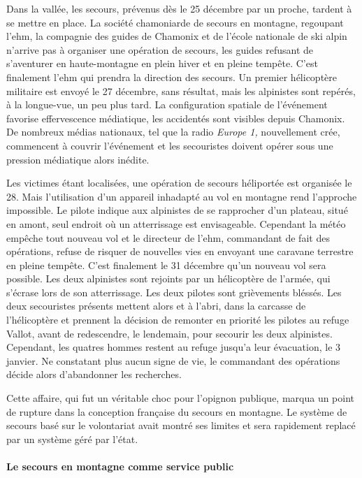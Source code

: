 Dans la vallée, les secours, prévenus dès le 25 décembre par un
proche, tardent à se mettre en place. La société chamoniarde de
secours en montagne, regoupant l'\ac{ehm}, la compagnie des guides de
Chamonix et de l'école nationale de ski alpin n'arrive pas à organiser
une opération de secours, les guides refusant de s'aventurer en
haute-montagne en plein hiver et en pleine tempête. C'est finalement
l'\ac{ehm} qui prendra la direction des secours. Un premier
hélicoptère militaire est envoyé le 27 décembre, sans résultat, mais
les alpinistes sont repérés, à la longue-vue, un peu plus tard. La
configuration spatiale de l'événement favorise effervescence
médiatique, les accidentés sont visibles depuis Chamonix. De nombreux
médias nationaux, tel que la radio \emph{Europe 1,} nouvellement crée,
commencent à couvrir l'événement et les secouristes doivent opérer
sous une pression médiatique alors inédite.

Les victimes étant localisées, une opération de secours héliportée est
organisée le 28. Mais l'utilisation d'un appareil inhadapté au vol en
montagne rend l'approche impossible. Le pilote indique aux alpinistes
de se rapprocher d'un plateau, situé en amont, seul endroit où un
atterrissage est envisageable. Cependant la météo empêche tout nouveau
vol et le directeur de l'\ac{ehm}, commandant de fait des opérations,
refuse de risquer de nouvelles vies en envoyant une caravane terrestre
en pleine tempête. C'est finalement le 31 décembre qu'un nouveau vol
sera possible. Les deux alpinistes sont rejoints par un hélicoptère de
l'armée, qui s'écrase lors de son atterrissage. Les deux pilotes sont
grièvements bléssés. Les deux secouristes présents mettent alors
 et  à l'abri, dans la carcasse de
l'hélicoptère et prennent la décision de remonter en priorité les
pilotes au refuge Vallot, avant de redescendre, le lendemain, pour
secourir les deux alpinistes. Cependant, les quatres hommes restent au
refuge jusqu'a leur évacuation, le 3 janvier. Ne constatant plus aucun
signe de vie, le commandant des opérations décide alors d'abandonner
les recherches.

Cette affaire, qui fut un véritable choc pour l'opignon publique,
marqua un point de rupture dans la conception française du secours en
montagne. Le système de secours basé sur le volontariat avait montré
ses limites et sera rapidement replacé par un système géré par
l'état.

\paragraph{Le secours en montagne comme service public}
\label{par:1-1-1-1-2}


